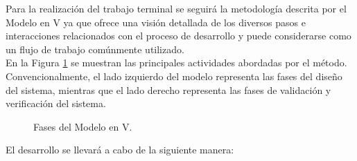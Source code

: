 Para la realización del trabajo terminal se seguirá la metodología descrita por el Modelo en V ya que ofrece una visión detallada de los diversos pasos e interacciones relacionados con el proceso de desarrollo y puede considerarse como un flujo de trabajo comúnmente utilizado. \cite{perez2006V} \\

En la Figura \ref{fig:IntroduccionMetodologia} se muestran las principales actividades abordadas por el método. Convencionalmente, el lado izquierdo del modelo representa las fases del diseño del sistema, mientras que el lado derecho representa las fases de validación y verificación del sistema. \\

\begin{figure}[htbp!]
	\centering
	\caption{Fases del Modelo en V.}
	\label{fig:IntroduccionMetodologia}
\end{figure}

El desarrollo se llevará a cabo de la siguiente manera: \\

